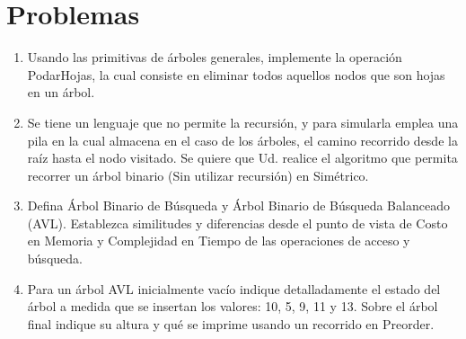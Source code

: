 \section{Problemas}
\begin{enumerate}
\item Usando las primitivas de árboles generales, implemente la operación PodarHojas, la cual consiste en eliminar todos aquellos nodos que son hojas en un árbol.
\item Se tiene un lenguaje que no permite la recursión, y para simularla emplea una pila en la cual almacena en el caso de los árboles, el camino recorrido desde la raíz hasta el nodo visitado. Se quiere que Ud. realice el algoritmo que permita recorrer un árbol binario (Sin utilizar recursión) en Simétrico.
\item Defina Árbol Binario de Búsqueda y Árbol Binario de Búsqueda Balanceado (AVL). Establezca similitudes y diferencias desde el punto de vista de Costo en Memoria y Complejidad en Tiempo de las operaciones de acceso y búsqueda.
\item Para un árbol AVL inicialmente vacío indique detalladamente el estado del árbol a medida que se insertan los valores: 10, 5, 9, 11 y 13. Sobre el árbol final indique su altura y qué se imprime usando un recorrido en Preorder.
\end{enumerate}
